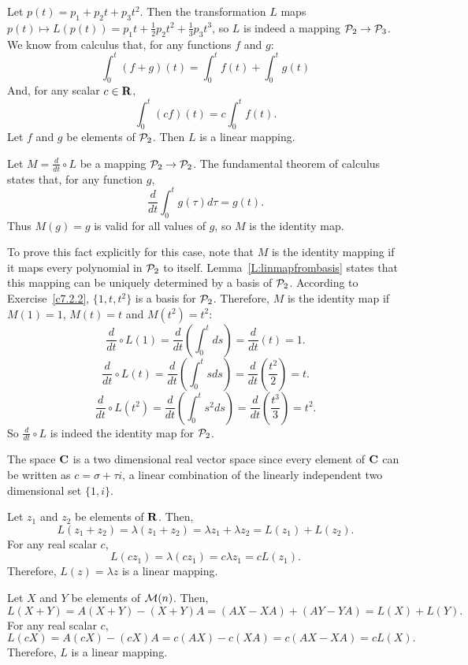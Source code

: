 \documentclass{ximera}
\begin{document}
Let $p(t) = p_1 + p_2t + p_3t^2$.  Then the transformation $L$
maps $p(t) \mapsto L(p(t)) = p_1t + \frac{1}{2}p_2t^2 +
\frac{1}{3}p_3t^3$, so $L$ is indeed a mapping ${\cal P}_2
\rightarrow {\cal P}_3$.  We know from calculus that, for any
functions $f$ and $g$:
\[ \int_0^t(f + g)(t) = \int_0^tf(t) + \int_0^tg(t) \]
And, for any scalar $c \in \mbox{$\bf{R}$}$,
\[ \int_0^t(cf)(t) = c\int_0^tf(t). \]
Let $f$ and $g$ be elements of ${\cal P}_2$.  Then $L$ is a linear
mapping.

Let $M = \frac{d}{dt} \circ L$ be a mapping ${\cal P}_2
\rightarrow {\cal P}_2$.  The fundamental
theorem of calculus states that, for any function $g$,
\[ \frac{d}{dt}\int_0^t g(\tau)d\tau = g(t). \]
Thus $M(g) = g$ is valid for all values of $g$, so $M$ is the
identity map.

\para To prove this fact explicitly for this case, note that $M$ is
the identity mapping if it maps every polynomial in ${\cal P}_2$ to
itself.  Lemma~\ref{L:linmapfrombasis} states that this mapping can
be uniquely determined by a basis of ${\cal P}_2$.  According to
Exercise~\ref{c7.2.2}, $\{1,t,t^2\}$ is a basis for ${\cal P}_2$. 
Therefore, $M$ is the identity map if $M(1) = 1$, $M(t) = t$ and
$M(t^2) = t^2$:
\[ \frac{d}{dt} \circ L (1) = \frac{d}{dt}\left(\int_0^tds\right) =
\frac{d}{dt}(t) = 1. \]
\[ \frac{d}{dt} \circ L (t) = \frac{d}{dt}\left(\int_0^tsds\right) =
\frac{d}{dt}\left(\frac{t^2}{2}\right) = t. \]
\[ \frac{d}{dt} \circ L (t^2) = \frac{d}{dt}\left(\int_0^ts^2ds\right) =
\frac{d}{dt}\left(\frac{t^3}{3}\right) = t^2. \]
So $\frac{d}{dt} \circ L$ is indeed the identity map for ${\cal P}_2$.

The space $\mbox{$\bf{C}$}$ is a two dimensional real vector space since every
element of $\mbox{$\bf{C}$}$ can be written as $c = \sigma + \tau i$, a linear
combination of the linearly independent two dimensional set $\{1,i\}$.

\para Let $z_1$ and $z_2$ be elements of $\mbox{$\bf{R}$}$.  Then,
\[ L(z_1 + z_2) = \lambda(z_1 + z_2) =
\lambda z_1 + \lambda z_2 = L(z_1) + L(z_2). \]
For any real scalar $c$,
\[ L(cz_1) = \lambda(cz_1) = 
c\lambda z_1 = cL(z_1). \]
Therefore, $L(z) = \lambda z$ is a linear mapping.

\newpage
{}
Let $X$ and $Y$ be elements of ${\cal M}(n)$.  Then,
\[ L(X + Y) = A(X + Y) - (X + Y)A = (AX - XA)
+ (AY - YA) = L(X) + L(Y). \]
For any real scalar $c$,
\[ L(cX) = A(cX) - (cX)A = c(AX) - c(XA) = c(AX - XA) = cL(X). \]
Therefore, $L$ is a linear mapping.
\end{document}
